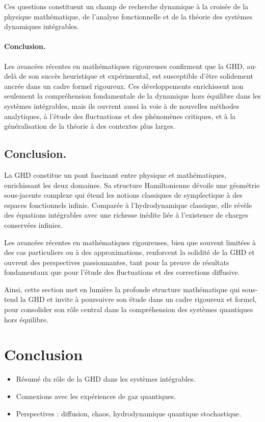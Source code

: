 Ces questions constituent un champ de recherche dynamique à la croisée de la physique mathématique, de l’analyse fonctionnelle et de la théorie des systèmes dynamiques intégrables.

\paragraph{Conclusion.}
Les avancées récentes en mathématiques rigoureuses confirment que la GHD, au-delà de son succès heuristique et expérimental, est susceptible d’être solidement ancrée dans un cadre formel rigoureux. Ces développements enrichissent non seulement la compréhension fondamentale de la dynamique hors équilibre dans les systèmes intégrables, mais ils ouvrent aussi la voie à de nouvelles méthodes analytiques, à l’étude des fluctuations et des phénomènes critiques, et à la généralisation de la théorie à des contextes plus larges.


\subsection*{Conclusion.}
La GHD constitue un pont fascinant entre physique et mathématiques, enrichissant les deux domaines. Sa structure Hamiltonienne dévoile une géométrie sous-jacente complexe qui étend les notions classiques de symplectique à des espaces fonctionnels infinis. Comparée à l’hydrodynamique classique, elle révèle des équations intégrables avec une richesse inédite liée à l’existence de charges conservées infinies.

Les avancées récentes en mathématiques rigoureuses, bien que souvent limitées à des cas particuliers ou à des approximations, renforcent la solidité de la GHD et ouvrent des perspectives passionnantes, tant pour la preuve de résultats fondamentaux que pour l’étude des fluctuations et des corrections diffusive.

Ainsi, cette section met en lumière la profonde structure mathématique qui sous-tend la GHD et invite à poursuivre son étude dans un cadre rigoureux et formel, pour consolider son rôle central dans la compréhension des systèmes quantiques hors équilibre.

\section*{Conclusion}
{\color{blue}
\begin{itemize}
    \item Résumé du rôle de la GHD dans les systèmes intégrables.
    \item Connexions avec les expériences de gaz quantiques.
    \item Perspectives : diffusion, chaos, hydrodynamique quantique stochastique.
\end{itemize}
}

